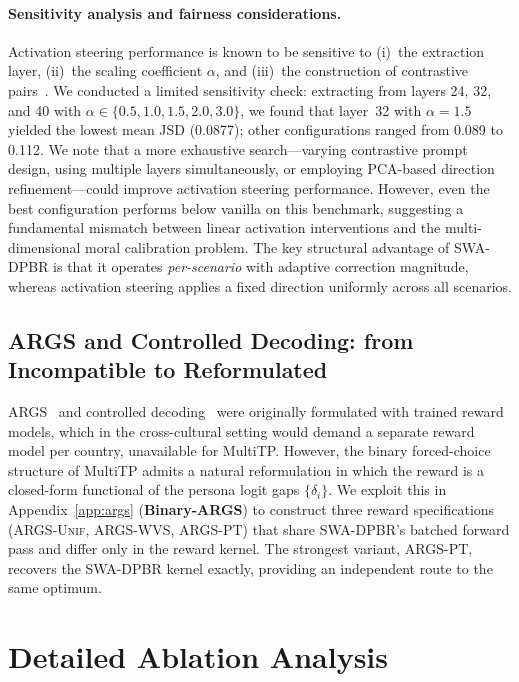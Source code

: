 \documentclass{article}
\begin{document}
\paragraph{Sensitivity analysis and fairness considerations.}
Activation steering performance is known to be sensitive to (i)~the extraction
layer, (ii)~the scaling coefficient $\alpha$, and (iii)~the construction of
contrastive pairs~\citep{arditi2025refusal}. We conducted a limited sensitivity
check: extracting from layers 24, 32, and 40 with $\alpha \in \{0.5, 1.0, 1.5,
2.0, 3.0\}$, we found that layer~32 with $\alpha=1.5$ yielded the lowest mean
JSD (0.0877); other configurations ranged from 0.089 to 0.112. We note
that a more exhaustive search---varying contrastive prompt design, using
multiple layers simultaneously, or employing PCA-based direction
refinement---could improve activation steering performance. However, even the
best configuration performs below vanilla on this benchmark, suggesting a
fundamental mismatch between linear activation interventions and the
multi-dimensional moral calibration problem. The key structural advantage of
SWA-DPBR is that it operates \emph{per-scenario} with adaptive correction
magnitude, whereas activation steering applies a fixed direction uniformly
across all scenarios.

\subsection{ARGS and Controlled Decoding: from Incompatible to Reformulated}
ARGS~\citep{khanov2024args} and controlled decoding~\citep{mudgal2024controlled}
were originally formulated with trained reward models, which in the cross-cultural
setting would demand a separate reward model per country, unavailable for MultiTP.
However, the binary forced-choice structure of MultiTP admits a natural
reformulation in which the reward is a closed-form functional of the persona logit
gaps $\{\delta_i\}$. We exploit this in Appendix~\ref{app:args} (\textbf{Binary-ARGS})
to construct three reward specifications (\textsc{ARGS-Unif}, \textsc{ARGS-WVS},
\textsc{ARGS-PT}) that share SWA-DPBR's batched forward pass and differ only in the
reward kernel. The strongest variant, \textsc{ARGS-PT}, recovers the SWA-DPBR kernel
exactly, providing an independent route to the same optimum.

\section{Detailed Ablation Analysis}
\label{app:ablation_detail}
\end{document}
